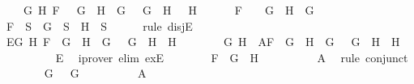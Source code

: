 \begin{isabellebody}
\ \ \ \ {\isacharparenleft}{\isasymexists}G{}\ H{}{\isachardot}\ F\ {\isacharequal}\ \isactrlbold {\isasymnot}\ {\isacharparenleft}G{}\ \isactrlbold {\isasymand}\ H{}{\isacharparenright}\ {\isasymand}\ G\ {\isacharequal}\ \isactrlbold {\isasymnot}\ G{}\ {\isasymand}\ H\ {\isacharequal}\ \isactrlbold {\isasymnot}\ H{}{\isacharparenright}\ {\isasymor}\ \isanewline
\ \ \ \ F\ {\isacharequal}\ \isactrlbold {\isasymnot}\ {\isacharparenleft}\isactrlbold {\isasymnot}\ G{\isacharparenright}\ {\isasymand}\ H\ {\isacharequal}\ G{\isachardoublequoteclose}\isanewline
\ \ \ \ \isamarkupfalse%
\ {\isachardoublequoteopen}F\ {\isasymin}\ S\ {\isasymlongrightarrow}\ G\ {\isasymin}\ S\ {\isasymor}\ H\ {\isasymin}\ S{\isachardoublequoteclose}\isanewline
\ \ \ \ \isamarkupfalse%
\ {\isacharparenleft}rule\ disjE{\isacharparenright}\isanewline
\ \ \ \ \ \ \isamarkupfalse%
\ E{}{\isacharcolon}{\isachardoublequoteopen}{\isasymexists}G{}\ H{}{\isachardot}\ F\ {\isacharequal}\ G{}\ \isactrlbold {\isasymrightarrow}\ H{}\ {\isasymand}\ G\ {\isacharequal}\ \isactrlbold {\isasymnot}\ G{}\ {\isasymand}\ H\ {\isacharequal}\ H{}{\isachardoublequoteclose}\isanewline
\ \ \ \ \ \ \isamarkupfalse%
\ G{}\ H{}\ \ A{}{\isacharcolon}{\isachardoublequoteopen}F\ {\isacharequal}\ G{}\ \isactrlbold {\isasymrightarrow}\ H{}\ {\isasymand}\ G\ {\isacharequal}\ \isactrlbold {\isasymnot}\ G{}\ {\isasymand}\ H\ {\isacharequal}\ H{}{\isachardoublequoteclose}\isanewline
\ \ \ \ \ \ \ \ \isamarkupfalse%
\ E{}\ \isamarkupfalse%
\ {\isacharparenleft}iprover\ elim{\isacharcolon}\ exE{\isacharparenright}\isanewline
\ \ \ \ \ \ \isamarkupfalse%
\ {\isachardoublequoteopen}F\ {\isacharequal}\ G{}\ \isactrlbold {\isasymrightarrow}\ H{}{\isachardoublequoteclose}\isanewline
\ \ \ \ \ \ \ \ \isamarkupfalse%
\ A{}\ \isamarkupfalse%
\ {\isacharparenleft}rule\ conjunct{}{\isacharparenright}\isanewline
\ \ \ \ \ \ \isamarkupfalse%
\ {\isachardoublequoteopen}G\ {\isacharequal}\ \isactrlbold {\isasymnot}\ G{}{\isachardoublequoteclose}\isanewline
\ \ \ \ \ \ \ \ \isamarkupfalse%
\ A{}\ \isamarkupfalse%

\end{isabellebody}
